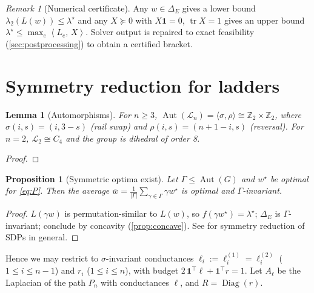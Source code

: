 \documentclass[11pt,a4paper]{article}
\newif\ifdraftnotes
\newcommand{\todo}[1]{\ifdraftnotes{\color{red!70!black}\sffamily[TODO: #1]}\fi}
\theoremstyle{plain}
\newtheorem{proposition}[theorem]{Proposition}
\newtheorem{lemma}[theorem]{Lemma}
\theoremstyle{definition}
\theoremstyle{remark}
\newtheorem{remark}[theorem]{Remark}
\newcommand{\one}{\mathbf{1}}
\newcommand{\ip}[2]{\left\langle #1,\, #2 \right\rangle}
\newcommand{\simplex}{\Delta}
\newcommand{\Lad}{\mathcal{L}}            %
\newcommand{\opt}{\lambda^{\star}}        %
\DeclareMathOperator{\tr}{tr}
\DeclareMathOperator{\Diag}{Diag}
\DeclareMathOperator{\Aut}{Aut}
\begin{document}
	\begin{remark}[Numerical certificate]\label{rem:certificate}
		Any $w\in\simplex_E$ gives a lower bound $\lambda_2(L(w))\le\opt$ and any
		$X\succeq0$ with $X\one=0$, $\tr X=1$ gives an upper bound
		$\opt\le\max_e\ip{L_e}{X}$. Solver output is repaired to exact
		feasibility (\cref{sec:postprocessing}) to obtain a certified bracket.
	\end{remark}
	
	\section{Symmetry reduction for ladders}\label{sec:symmetry}
	
	\begin{lemma}[Automorphisms]\label{lem:aut}
		For $n\ge3$, $\Aut(\Lad_n)=\langle\sigma,\rho\rangle\cong
		\mathbb Z_2\times\mathbb Z_2$, where $\sigma(i,s)=(i,3-s)$ (rail swap) and
		$\rho(i,s)=(n+1-i,s)$ (reversal). For $n=2$, $\Lad_2\cong C_4$ and the
		group is dihedral of order 8.
	\end{lemma}
	\begin{proof}\todo{Corners are the only vertices of degree 2 \dots}\end{proof}
	
	\begin{proposition}[Symmetric optima exist]\label{prop:symmetrise}
		Let $\Gamma\le\Aut(G)$ and $w^\star$ be optimal for \eqref{eq:P}. Then the
		average $\bar w=\frac1{|\Gamma|}\sum_{\gamma\in\Gamma}\gamma w^\star$ is
		optimal and $\Gamma$-invariant.
	\end{proposition}
	\begin{proof}
		$L(\gamma w)$ is permutation-similar to $L(w)$, so
		$f(\gamma w^\star)=\opt$; $\simplex_E$ is $\Gamma$-invariant; conclude by
		concavity (\cref{prop:concave}). See \cite{GatermannParrilo2004} for
		symmetry reduction of SDPs in general.
	\end{proof}
	
	Hence we may restrict to $\sigma$-invariant conductances
	$\ell_i:=\ell^{(1)}_i=\ell^{(2)}_i$ ($1\le i\le n-1$) and $r_i$
	($1\le i\le n$), with budget $2\,\one^\top\ell+\one^\top r=1$. Let
	$A_\ell$ be the Laplacian of the path $P_n$ with conductances $\ell$, and
	$R=\Diag(r)$.
	
\end{document}
